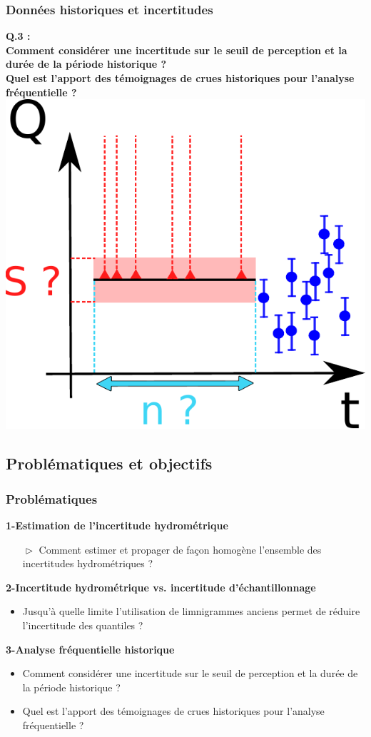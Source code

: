 \documentclass[compress,9pt]{beamer}
\begin{document}
	\begin{frame}
		\frametitle{Données historiques et incertitudes}
		\centering
		\large{\textbf{Q.3 :\\
		\vfill
		Comment considérer une incertitude sur le seuil de perception et la durée de la période historique ?\\
		\vfill
		Quel est l'apport des témoignages de crues historiques pour l'analyse fréquentielle ?\\}}
		\vfill
		\includegraphics[width = .35\textwidth]{./Figures/uSuN.pdf}
	\end{frame}
	
	\subsection{Problématiques et objectifs}
	\begin{frame}
	    \frametitle{Problématiques}
		\vfill
		\large{\textbf{1-Estimation de l'incertitude hydrométrique}}
		\vspace{5pt}
		\begin{itemize}
			\item [$\vartriangleright$] Comment estimer et propager de façon homogène l'ensemble des incertitudes hydrométriques ? 
		\end{itemize}
		\vfill
		\large{\textbf{2-Incertitude hydrométrique vs. incertitude d'échantillonnage}}
		\vspace{5pt}
		\begin{itemize}
			\item<2->[$\vartriangleright$] Jusqu'à quelle limite l'utilisation de limnigrammes anciens permet de réduire l'incertitude des quantiles ?
		\end{itemize}
		\vfill
		\large{\textbf{3-Analyse fréquentielle historique}}
		\vspace{5pt}
		\begin{itemize}
			\item<3-> [$\vartriangleright$] Comment considérer une incertitude sur le seuil de perception et la durée de la période historique ?\\
			\item<3->[$\vartriangleright$] Quel est l'apport des témoignages de crues historiques pour l'analyse fréquentielle ?
		\end{itemize}
		\vfill
	\end{frame}
	
\end{document}
